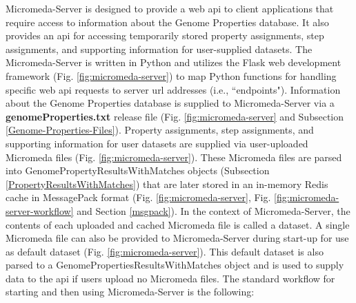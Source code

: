 Micromeda-Server is designed to provide a web \gls{api} to client applications that require access to information about the Genome Properties database. It also provides an \gls{api} for accessing temporarily stored property assignments, step assignments, and supporting information for user-supplied datasets. The Micromeda-Server is written in Python and utilizes the Flask web development framework \cite{grinberg2018flask} (Fig. \ref{fig:micromeda-server}) to map Python functions for handling specific web \gls{api} requests to server \gls{url} addresses (i.e., ``endpoints"). Information about the Genome Properties database is supplied to Micromeda-Server via a \textbf{genomeProperties.txt} release file (Fig. \ref{fig:micromeda-server} and Subsection \ref{Genome-Properties-Files}). Property assignments, step assignments, and supporting information for user datasets are supplied via user-uploaded Micromeda files (Fig. \ref{fig:micromeda-server}). These Micromeda files are parsed into GenomePropertyResultsWithMatches objects (Subsection \ref{PropertyResultsWithMatches}) that are later stored in an in-memory Redis cache \cite{han2011survey} in MessagePack format \cite{furuhashi2013messagepack} (Fig. \ref{fig:micromeda-server}, Fig. \ref{fig:micromeda-server-workflow} and Section \ref{msgpack}). In the context of Micromeda-Server, the contents of each uploaded and cached Micromeda file is called a dataset. A single Micromeda file can also be provided to Micromeda-Server during start-up for use as default dataset (Fig. \ref{fig:micromeda-server}). This default dataset is also parsed to a GenomePropertiesResultsWithMatches object and is used to supply data to the \gls{api} if users upload no Micromeda files. The standard workflow for starting and then using Micromeda-Server is the following:

